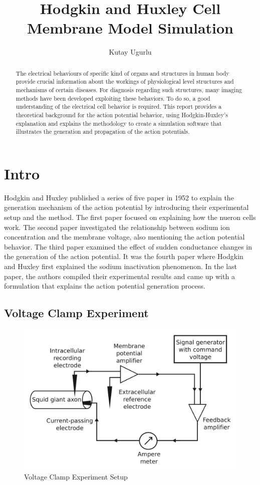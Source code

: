 \documentclass{IEEEtran}
\title{Hodgkin and Huxley Cell Membrane Model Simulation}
\author{Kutay Ugurlu}
\begin{document}
\maketitle
\begin{abstract}
    The electrical behaviours of specific kind of organs and structures in human body provide crucial information about the workings of physiological level structures and mechanisms of certain diseases. For diagnosis regarding such structures, many imaging methods have been developed exploiting these behaviors. To do so, a good understanding of the electrical cell behavior is required. This report provides a theoretical background for the action potential behavior, using Hodgkin-Huxley's explanation and explains the methodology to create a simulation software that illustrates the generation and propagation of the action potentials. 
\end{abstract}
\section{Intro}
Hodgkin and Huxley \cite{hodgkin1952quantitative} published a series of five paper in 1952 to explain the generation mechanism of the action potential by introducing their experimental setup and the method. The first paper focused on explaining how the nueron cells work. The second paper investigated the relationship between sodium ion concentration and the membrane voltage, also mentioning the action potential behavior. The third paper examined the effect of sudden conductance changes in the generation of the action potential. It was the fourth paper where Hodgkin and Huxley first explained the sodium inactivation phenomenon. In the last paper, the authors compiled their experimental results and came up with a formulation that explains the action potential generation process. 

\subsection{Voltage Clamp Experiment}

\begin{figure}[h]
\centering
\includegraphics[width=\textwidth]{VCE.png}
\caption{Voltage Clamp Experiment Setup}\label{fig:vce}
\end{figure}
\end{document}
